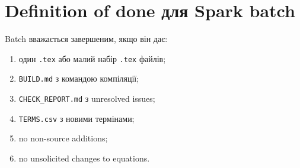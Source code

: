 \section{Definition of done для Spark batch}

Batch вважається завершеним, якщо він дає:
\begin{enumerate}[label=\arabic*.]
\item один \texttt{.tex} або малий набір \texttt{.tex} файлів;
\item \texttt{BUILD.md} з командою компіляції;
\item \texttt{CHECK\_REPORT.md} з unresolved issues;
\item \texttt{TERMS.csv} з новими термінами;
\item no non-source additions;
\item no unsolicited changes to equations.
\end{enumerate}

